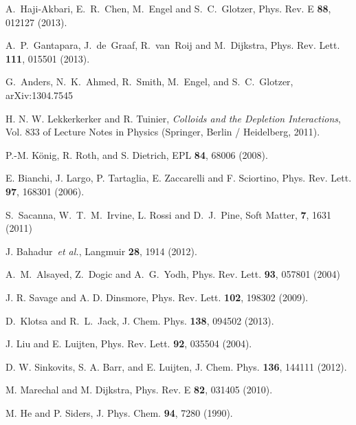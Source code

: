 \documentclass[10pt,onside,singlecolumn]{article}
\begin{document}
{\begin{thebibliography}{99}
A.~Haji-Akbari, E.~R.~Chen, M.~Engel and S.~C.~Glotzer, Phys. Rev. E {\bf 88}, 012127 (2013).

A.~P.~Gantapara, J.~de~Graaf, R.~van~Roij and M.~Dijkstra, Phys. Rev. Lett. {\bf 111}, 015501 (2013).

G.~Anders, N.~K.~Ahmed, R.~Smith, M.~Engel, and S.~C.~Glotzer, arXiv:1304.7545 

H. N. W. Lekkerkerker and R. Tuinier, \emph{Colloids and
the Depletion Interactions}, Vol. 833 of Lecture Notes in
Physics (Springer, Berlin / Heidelberg, 2011).

P.-M. K\"onig, R. Roth, and S. Dietrich, EPL {\bf84}, 68006 (2008).

E. Bianchi, J. Largo, P. Tartaglia, E. Zaccarelli and F. Sciortino, Phys. Rev. Lett. {\bf97}, 168301 (2006).


S.~Sacanna, W.~T.~M.~Irvine, L. Rossi and D.~J.~Pine, Soft Matter, {\bf 7}, 1631 (2011)

J. Bahadur~\emph{et al.}, Langmuir {\bf 28}, 1914 (2012).

A.~M.~Alsayed, Z.~Dogic and A.~G.~Yodh, Phys. Rev. Lett. {\bf 93}, 057801 (2004)

J. R. Savage and A. D. Dinsmore, Phys. Rev. Lett. {\bf102}, 198302 (2009). 

D.~Klotsa and R.~L.~Jack, J. Chem. Phys. {\bf 138}, 094502 (2013).

%

J. Liu and E. Luijten, Phys. Rev. Lett. {\bf 92}, 035504 (2004).

D. W. Sinkovits, S. A. Barr, and E. Luijten,
J. Chem. Phys. {\bf 136}, 144111 (2012).

M. Marechal and M. Dijkstra, Phys. Rev. E {\bf 82}, 031405
(2010).

M. He and P. Siders, J. Phys. Chem. {\bf 94}, 7280 (1990).


\end{thebibliography}}
\end{document}
